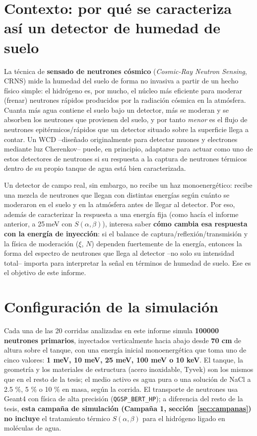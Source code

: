 \documentclass[11pt,a4paper]{article}
\newcommand{\codigo}[1]{\nolinkurl{#1}}
\begin{document}
\section{Contexto: por qué se caracteriza así un detector de humedad de suelo}
\label{sec:contexto}

La técnica de \textbf{sensado de neutrones cósmico} (\textit{Cosmic-Ray Neutron Sensing}, CRNS) mide la humedad del suelo de forma no invasiva a partir de un hecho físico simple: el hidrógeno es, por mucho, el núcleo más eficiente para moderar (frenar) neutrones rápidos producidos por la radiación cósmica en la atmósfera. Cuanta más agua contiene el suelo bajo un detector, más se moderan y se absorben los neutrones que provienen del suelo, y por tanto \emph{menor} es el flujo de neutrones epitérmicos/rápidos que un detector situado sobre la superficie llega a contar. Un WCD --diseñado originalmente para detectar muones y electrones mediante luz Cherenkov-- puede, en principio,
adaptarse para actuar como uno de estos detectores de neutrones si su respuesta a la captura de neutrones térmicos dentro de su propio tanque de agua está bien caracterizada.

Un detector de campo real, sin embargo, no recibe un haz monoenergético: recibe una mezcla de neutrones que llegan con distintas energías según cuánto se moderaron en el suelo y en la atmósfera antes de llegar al detector. Por eso, además de caracterizar la respuesta a una energía fija (como hacía el informe anterior, a 25\,meV con $S(\alpha,\beta)$), interesa saber \textbf{cómo cambia esa respuesta con la energía de inyección}: si el balance de captura/reflexión/transmisión y la física de moderación ($\xi$, $N$) dependen fuertemente de la energía, entonces la forma del espectro de neutrones que llega al detector --no solo su intensidad total-- importa para interpretar la señal en términos de
humedad de suelo. Ese es el objetivo de este informe.

\section{Configuración de la simulación}
\label{sec:sim}

Cada una de las 20 corridas analizadas en este informe simula \textbf{100000 neutrones primarios}, inyectados verticalmente hacia abajo desde \textbf{70 cm} de altura sobre el tanque, con una energía inicial monoenergética que toma uno de cinco valores: \textbf{1 meV, 10 meV, 25 meV, 100 meV o 10 keV}. El tanque, la geometría y los materiales de estructura (acero inoxidable, Tyvek) son los mismos que en el resto de la tesis; el medio activo es agua pura o una solución de NaCl a 2.5 \%, 5 \% o 10 \% en masa, según la corrida. El transporte de neutrones usa Geant4 con física de alta precisión (\codigo{QGSP\_BERT\_HP}); a diferencia del resto de la tesis, \textbf{esta campaña de simulación (Campaña 1, sección~\ref{sec:campanas}) no incluye} el tratamiento térmico $S(\alpha,\beta)$ para el hidrógeno ligado en moléculas de agua.
\end{document}
